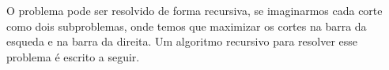 \documentclass[twocolumn]{article}
\theoremstyle{mytheoremstyle}
\theoremstyle{mytheoremstyle}
\theoremstyle{myproblemstyle}
\begin{document}
            O problema pode ser resolvido de forma recursiva, se imaginarmos cada corte como dois subproblemas,
            onde temos que maximizar os cortes na barra da esqueda e na barra da direita. Um algoritmo recursivo
            para resolver esse problema é escrito a seguir.
            \begin{algorithm}

            \end{algorithm}





    {}
    
\end{document}
